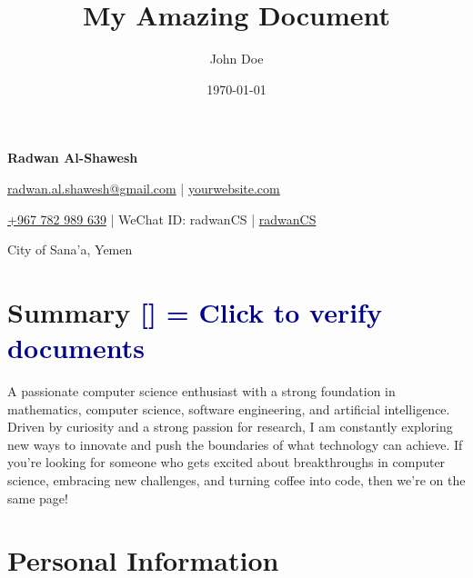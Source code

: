 \documentclass[a4paper,11pt]{article}
\title{My Amazing Document}
\author{John Doe}
\date{\today}  %
\newcommand{\socialicon}[1]{\raisebox{-0.05em}{\resizebox{!}{1em}{#1}}}
\newcommand{\headerfontiii}{\fontfamily{ppl}\selectfont} %
\begin{document}
	\headerfontiii
	
	\begin{center}
		{\Huge\textbf{Radwan Al-Shawesh}}
	\end{center}
	\vspace{-6mm}
	
	\begin{center}
		\small{
			\href{mailto:radwan.al.shawesh@gmail.com}{radwan.al.shawesh@gmail.com} | 
			\href{https://www.yourwebsite.com/}{yourwebsite.com}
		}
	\end{center}
	\vspace{-6mm}
	
	\begin{center}
		\small{
			\socialicon{\faWhatsappSquare} \href{https://wa.me/967782989639}{+967 782 989 639} |
			\socialicon{\faWeixin} WeChat ID: radwanCS |
			\socialicon{\faGithub} \href{https://github.com/radwanCS}{radwanCS}
		}
	\end{center}
	\vspace{-6mm}
	
	\begin{center}
		\small{City of Sana'a, Yemen}
	\end{center}
	\vspace{-4mm}

	\section{\texorpdfstring{\textbf{Summary} \hspace*{\fill} 
    \textcolor{darkblue}{\scriptsize [\href{https://1drv.ms/f/c/0b66680558f854cf/EmMcNN-2rp5JkBqREvrLziABZw0qcxK9gYBRxxkRwz2g9A?e=Dd3Xgb}{\faGlobe}] = Click to verify documents}}{Summary}}

	\vspace{1mm}
	\small{
		A passionate computer science enthusiast with a strong foundation in mathematics, computer science, software engineering, and 
		artificial intelligence. Driven by curiosity and a strong passion for research, I am constantly exploring new ways to innovate 
		and push the boundaries of what technology can achieve. If you're looking for someone who gets excited about breakthroughs in computer science, 
		embracing new challenges, and turning coffee into code, then we’re on the same page!
	}
	\vspace{-2mm}
	
	\section{\textbf{Personal Information}}
	\vspace{2mm}
	
\end{document}
